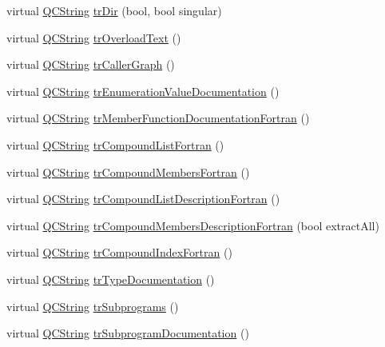 \begin{DoxyCompactItemize}
\item 
virtual \hyperlink{class_q_c_string}{Q\-C\-String} \hyperlink{class_translator_ukrainian_a04c201b0a4fa9c3097cb40fa9e51517f}{tr\-Dir} (bool, bool singular)
\item 
virtual \hyperlink{class_q_c_string}{Q\-C\-String} \hyperlink{class_translator_ukrainian_ac5436cb286c48cd540d0cdce200a82b9}{tr\-Overload\-Text} ()
\item 
virtual \hyperlink{class_q_c_string}{Q\-C\-String} \hyperlink{class_translator_ukrainian_ae1d7d38cc426cd25124b1658b1125841}{tr\-Caller\-Graph} ()
\item 
virtual \hyperlink{class_q_c_string}{Q\-C\-String} \hyperlink{class_translator_ukrainian_a4039294191fddf0e9530b920719998fd}{tr\-Enumeration\-Value\-Documentation} ()
\item 
virtual \hyperlink{class_q_c_string}{Q\-C\-String} \hyperlink{class_translator_ukrainian_a006270b30df57f83fe40ad0ed617652e}{tr\-Member\-Function\-Documentation\-Fortran} ()
\item 
virtual \hyperlink{class_q_c_string}{Q\-C\-String} \hyperlink{class_translator_ukrainian_a17985bd956c4940e53e169cadb659c2b}{tr\-Compound\-List\-Fortran} ()
\item 
virtual \hyperlink{class_q_c_string}{Q\-C\-String} \hyperlink{class_translator_ukrainian_add44aa8baf655554ec74dbfac0d43f71}{tr\-Compound\-Members\-Fortran} ()
\item 
virtual \hyperlink{class_q_c_string}{Q\-C\-String} \hyperlink{class_translator_ukrainian_a10aa72b35051f95ba30f2b0312ce705c}{tr\-Compound\-List\-Description\-Fortran} ()
\item 
virtual \hyperlink{class_q_c_string}{Q\-C\-String} \hyperlink{class_translator_ukrainian_a0c98da65b5772e9c2876855a42d44127}{tr\-Compound\-Members\-Description\-Fortran} (bool extract\-All)
\item 
virtual \hyperlink{class_q_c_string}{Q\-C\-String} \hyperlink{class_translator_ukrainian_a933624b6cffb8fdc03e9fc4110640fc9}{tr\-Compound\-Index\-Fortran} ()
\item 
virtual \hyperlink{class_q_c_string}{Q\-C\-String} \hyperlink{class_translator_ukrainian_ae031421205271f1a32fa3838a79b8902}{tr\-Type\-Documentation} ()
\item 
virtual \hyperlink{class_q_c_string}{Q\-C\-String} \hyperlink{class_translator_ukrainian_a8d4e1de8fb5c2af1fd073c682556f999}{tr\-Subprograms} ()
\item 
virtual \hyperlink{class_q_c_string}{Q\-C\-String} \hyperlink{class_translator_ukrainian_add6df0842eb6016d108814567d677055}{tr\-Subprogram\-Documentation} ()

\end{DoxyCompactItemize}
